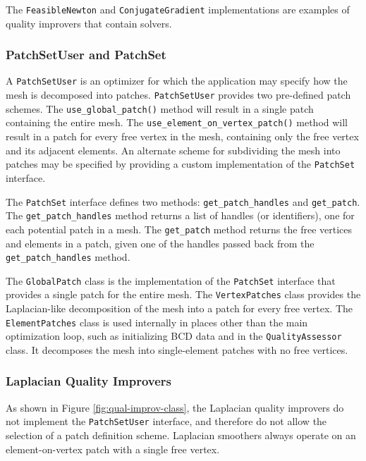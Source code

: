 \documentclass{article}
\begin{document}
The \texttt{FeasibleNewton} and \texttt{ConjugateGradient} implementations are examples of quality improvers that contain solvers.

\subsubsection{PatchSetUser and PatchSet}

A \texttt{PatchSetUser} is an optimizer for which the application may specify how the mesh is decomposed into patches.  \texttt{PatchSetUser} provides two pre-defined patch schemes.  The \texttt{use\_global\_patch()} method will result in a single patch containing the entire mesh.  The \texttt{use\_element\_on\_vertex\_patch()} method will result in a patch for every free vertex in the mesh, containing only the free vertex and its adjacent elements.  An alternate scheme for subdividing the mesh into patches may be specified by providing a custom implementation of the \texttt{PatchSet} interface.

The \texttt{PatchSet} interface defines two methods: \texttt{get\_patch\_handles} and \texttt{get\_patch}.  The \texttt{get\_patch\_handles} method returns a list of handles (or identifiers), one for each potential patch in a mesh.  The \texttt{get\_patch} method returns the free vertices and elements in a patch, given one of the handles passed back from the \texttt{get\_patch\_handles} method.

The \texttt{GlobalPatch} class is the implementation of the \texttt{PatchSet} interface that provides a single patch for the entire mesh.  The \texttt{VertexPatches} class provides the Laplacian-like decomposition of the mesh into a patch for every free vertex.  The \texttt{ElementPatches} class is used internally in places other than the main optimization loop, such as initializing BCD data and in the \texttt{QualityAssessor} class.  It decomposes the mesh into single-element patches with no free vertices.

\subsubsection{Laplacian Quality Improvers}

As shown in Figure \ref{fig:qual-improv-class}, the Laplacian quality improvers do not implement the \texttt{PatchSetUser} interface, and therefore do not allow the selection of a patch definition scheme.  Laplacian smoothers always operate on an element-on-vertex patch with a single free vertex.  
\end{document}
